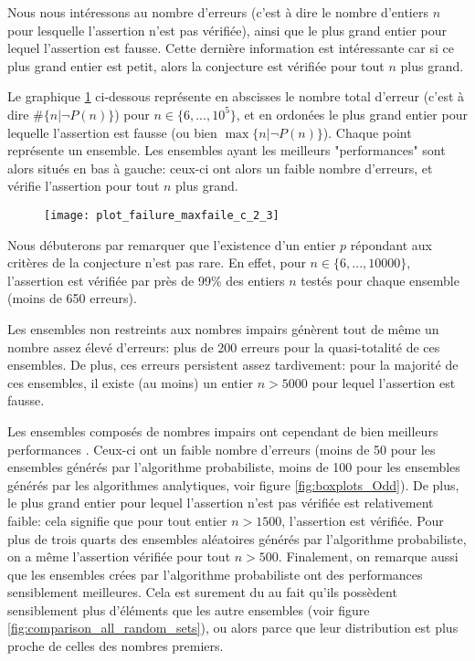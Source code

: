 \documentclass[../main.text]{report}
\begin{document}
Nous nous intéressons au nombre d'erreurs (c'est à dire le nombre d'entiers $n$ pour lesquelle l'assertion n'est pas vérifiée), ainsi que le plus grand entier pour lequel l'assertion est fausse. Cette dernière information est intéressante car si ce plus grand entier est petit, alors la conjecture est vérifiée pour tout $n$ plus grand.

Le graphique \ref{fig:failures_2_3} ci-dessous représente en abscisses le nombre total d'erreur (c'est à dire $\#\{n | \neg P(n)\}$) pour $n \in \{6,...,10^5\}$, et en ordonées le plus grand entier pour lequelle l'assertion est fausse (ou bien $\max \{n | \neg P(n)\}$). Chaque point représente un ensemble. Les ensembles ayant les meilleurs "performances" sont alors situés en bas à gauche: ceux-ci ont alors un faible nombre d'erreurs, et vérifie l'assertion pour tout $n$ plus grand. 

\begin{figure}[H]
\centering
\texttt{[image: plot\_failure\_maxfaile\_c\_2\_3]}
\caption{}
\label{fig:failures_2_3}
\end{figure}

Nous débuterons par remarquer que l'existence d'un entier $p$ répondant aux critères de la conjecture n'est pas rare. En effet, pour $ n \in \{6,...,10000\}$, l'assertion est vérifiée par près de 99\% des entiers $n$ testés pour chaque ensemble (moins de 650 erreurs). 

Les ensembles non restreints aux nombres impairs génèrent tout de même un nombre assez élevé d'erreurs: plus de 200 erreurs pour la quasi-totalité de ces ensembles.
De plus, ces erreurs persistent assez tardivement: pour la majorité de ces ensembles, il existe (au moins) un entier $n > 5000$ pour lequel l'assertion est fausse. 


Les ensembles composés de nombres impairs ont cependant de bien meilleurs performances . Ceux-ci ont un faible nombre d'erreurs (moins de 50 pour les ensembles générés par l'algorithme probabiliste, moins de 100 pour les ensembles générés par les algorithmes analytiques, voir figure \ref{fig:boxplots_Odd}). 
De plus, le plus grand entier pour lequel l'assertion n'est pas vérifiée est relativement faible: cela signifie que pour tout entier $n > 1500$, l'assertion est vérifiée. Pour plus de trois quarts des ensembles aléatoires générés par l'algorithme probabiliste, on a même l'assertion vérifiée pour tout $n > 500$.
Finalement, on remarque aussi que les ensembles crées par l'algorithme probabiliste ont des performances sensiblement meilleures. Cela est surement du au fait qu'ils possèdent sensiblement plus d'éléments que les autre ensembles (voir figure \ref{fig:comparison_all_random_sets}), ou alors parce que leur distribution est plus proche de celles des nombres premiers.
\end{document}
